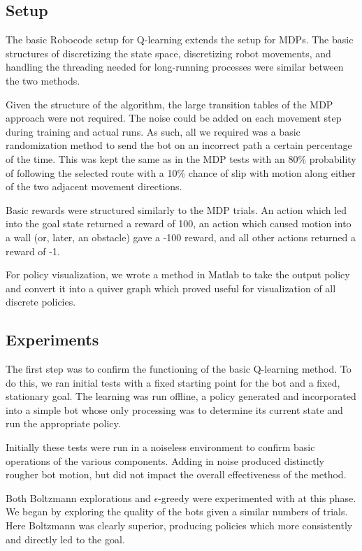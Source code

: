 \documentclass{aiaa-tc}%
\begin{document}
\subsection{Setup}

The basic Robocode setup for Q-learning extends
the setup for MDPs. The basic structures of discretizing the state
space, discretizing robot movements, and handling the threading needed
for long-running processes were similar between the two methods.

Given the structure of the algorithm, the large transition tables of
the MDP approach were not required. The noise could be added on each movement
step during training and actual runs. As such, all we required was a
basic randomization method to send the bot on an incorrect path a
certain percentage of the time. This was kept the same as in the MDP
tests with an 80\% probability of following the selected route with a
10\% chance of slip with motion along either of the two adjacent
movement directions.

Basic rewards were structured similarly to the MDP trials. An action
which led into the goal state returned a reward of 100, an action
which caused motion into a
wall (or, later, an obstacle) gave a -100 reward, and all other
actions returned a reward of -1.

For policy visualization, we wrote a method in Matlab to take the output
policy and convert it into a quiver graph which proved useful for
visualization of all discrete policies.

\subsection{Experiments}

The first step was to confirm the functioning of the basic
Q-learning method. To do this, we ran initial tests with a fixed
starting point for the bot and a fixed, stationary
goal. The learning was run offline, a policy generated and
incorporated into a simple bot whose only processing was to determine
its current state and run the appropriate policy.

Initially these tests were run in a noiseless environment to
confirm basic operations of the various components. Adding in noise
produced distinctly rougher bot motion, but did not impact the overall
effectiveness of the method.

Both Boltzmann explorations and $\epsilon$-greedy were experimented
with at this phase.  We began by exploring the quality of the bots
given a similar numbers of trials. Here Boltzmann was clearly
superior, producing policies which more consistently and directly led
to the goal.
\end{document}
